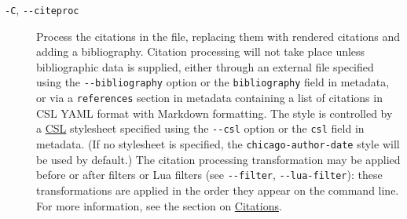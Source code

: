\documentclass[
]{article}
\begin{document}
\begin{description}
\item[\texttt{-C}, \texttt{-\/-citeproc}]
Process the citations in the file, replacing them with rendered
citations and adding a bibliography. Citation processing will not take
place unless bibliographic data is supplied, either through an external
file specified using the \texttt{-\/-bibliography} option or the
\texttt{bibliography} field in metadata, or via a \texttt{references}
section in metadata containing a list of citations in CSL YAML format
with Markdown formatting. The style is controlled by a
\href{https://docs.citationstyles.org/en/stable/specification.html}{CSL}
stylesheet specified using the \texttt{-\/-csl} option or the
\texttt{csl} field in metadata. (If no stylesheet is specified, the
\texttt{chicago-author-date} style will be used by default.) The
citation processing transformation may be applied before or after
filters or Lua filters (see \texttt{-\/-filter},
\texttt{-\/-lua-filter}): these transformations are applied in the order
they appear on the command line. For more information, see the section
on \protect\hyperlink{citations}{Citations}.


\end{description}
\end{document}

